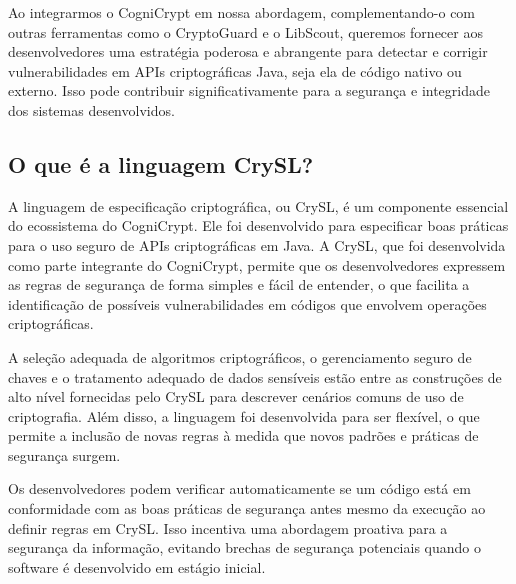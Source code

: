 Ao integrarmos o CogniCrypt em nossa abordagem, complementando-o com outras ferramentas como o CryptoGuard e o LibScout, queremos fornecer aos desenvolvedores uma estratégia poderosa e abrangente para detectar e corrigir vulnerabilidades em APIs criptográficas Java, seja ela de código nativo ou externo. Isso pode contribuir significativamente para a segurança e integridade dos sistemas desenvolvidos.




\subsection{O que é a linguagem CrySL?} %

A linguagem de especificação criptográfica, ou CrySL, é um componente essencial do ecossistema do CogniCrypt. Ele foi desenvolvido para especificar boas práticas para o uso seguro de APIs criptográficas em Java. A CrySL, que foi desenvolvida como parte integrante do CogniCrypt, permite que os desenvolvedores expressem as regras de segurança de forma simples e fácil de entender, o que facilita a identificação de possíveis vulnerabilidades em códigos que envolvem operações criptográficas. \cite{CogniCrypt}

A seleção adequada de algoritmos criptográficos, o gerenciamento seguro de chaves e o tratamento adequado de dados sensíveis estão entre as construções de alto nível fornecidas pelo CrySL para descrever cenários comuns de uso de criptografia. Além disso, a linguagem foi desenvolvida para ser flexível, o que permite a inclusão de novas regras à medida que novos padrões e práticas de segurança surgem. \cite{CogniCrypt}

Os desenvolvedores podem verificar automaticamente se um código está em conformidade com as boas práticas de segurança antes mesmo da execução ao definir regras em CrySL. Isso incentiva uma abordagem proativa para a segurança da informação, evitando brechas de segurança potenciais quando o software é desenvolvido em estágio inicial. \cite{CogniCrypt}

